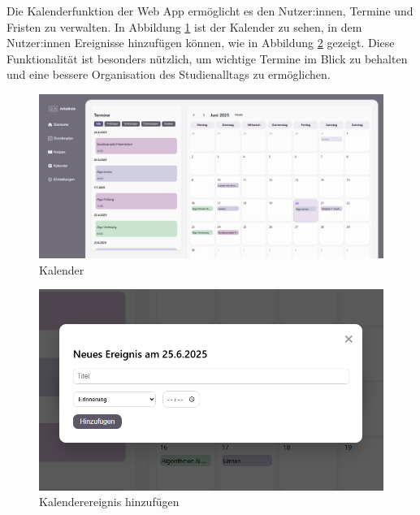 Die Kalenderfunktion der Web App ermöglicht es den Nutzer:innen, Termine und Fristen zu verwalten. In Abbildung \ref{fig:kalender} ist der Kalender zu sehen, in dem Nutzer:innen Ereignisse hinzufügen können, wie in Abbildung \ref{fig:kalender-ereignis} gezeigt. Diese Funktionalität ist besonders nützlich, um wichtige Termine im Blick zu behalten und eine bessere Organisation des Studienalltags zu ermöglichen.\newline
\begin{figure}[H]
  \centering
  \includegraphics[width=1\textwidth]{./images/kalender.png}
  \caption{Kalender}
  \label{fig:kalender}
\end{figure}

\begin{figure}[H]
  \centering
  \includegraphics[width=1\textwidth]{./images/kalender-ereignis.png}
  \caption{Kalenderereignis hinzufügen}
  \label{fig:kalender-ereignis}
\end{figure}

